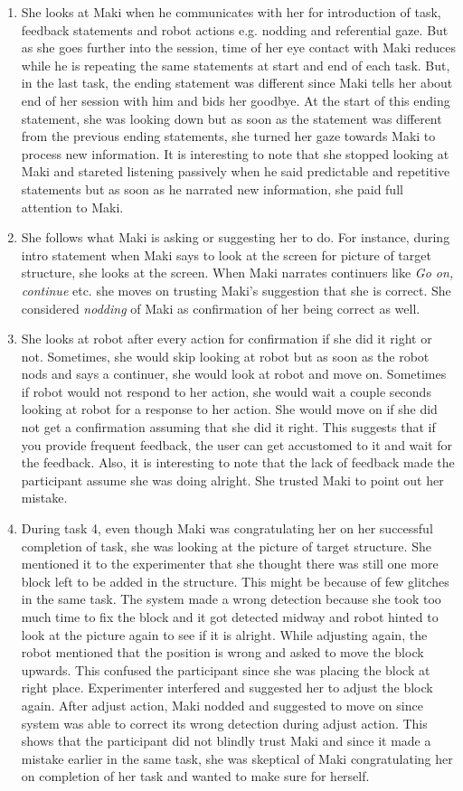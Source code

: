 \begin{enumerate}
    \item She looks at Maki when he communicates with her for introduction of task, feedback statements and robot actions e.g. nodding and referential gaze. But as she goes further into the session, time of her eye contact with Maki reduces while he is repeating the same statements at start and end of each task. But, in the last task, the ending statement was different since Maki tells her about end of her session with him and bids her goodbye. At the start of this ending statement, she was looking down but as soon as the statement was different from the previous ending statements, she turned her gaze towards Maki to process new information. It is interesting to note that she stopped looking at Maki and stareted listening passively when he said predictable and repetitive statements but as soon as he narrated new information, she paid full attention to Maki. 
    \item She follows what Maki is asking or suggesting her to do. For instance, during intro statement when Maki says to look at the screen for picture of target structure, she looks at the screen. When Maki narrates continuers like \emph{Go on, continue} etc. she moves on trusting Maki's suggestion that she is correct. She considered \emph{nodding} of Maki as confirmation of her being correct as well.
    \item She looks at robot after every action for confirmation if she did it right or not. Sometimes, she would skip looking at robot but as soon as the robot nods and says a continuer, she would look at robot and move on. Sometimes if robot would not respond to her action, she would wait a couple seconds looking at robot for a response to her action. She would move on if she did not get a confirmation assuming that she did it right. This suggests that if you provide frequent feedback, the user can get accustomed to it and wait for the feedback. Also, it is interesting to note that the lack of feedback made the participant assume she was doing alright. She trusted Maki to point out her mistake. 
    \item During task 4, even though Maki was congratulating her on her successful completion of task, she was looking at the picture of target structure. She mentioned it to the experimenter that she thought there was still one more block left to be added in the structure.  This might be because of few glitches in the same task. The system made a wrong detection because she took too much time to fix the block and it got detected midway and robot hinted to look at the picture again to see if it is alright. While adjusting again, the robot mentioned that the position is wrong and asked to move the block upwards. This confused the participant since she was placing the block at right place. Experimenter interfered and suggested her to adjust the block again. After adjust action, Maki nodded and suggested to move on since system was able to correct its wrong detection during adjust action. This shows that the participant did not blindly trust Maki and since it made a mistake earlier in the same task, she was skeptical of Maki congratulating her on completion of her task and wanted to make sure for herself.

\end{enumerate}
